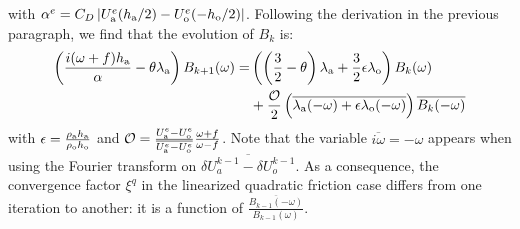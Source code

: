 with $\alpha^e=C_D\left|U_{\rm a}^e(h_{\rm a}/2) - U_{\rm o}^e(-h_{\rm o}/2)\right|$.
Following the derivation in the previous paragraph,
we find that the evolution of $B_k$ is:
\begin{equation}
	\label{eq:OASchwarz_ConvergenceAnalysis_linearizedCV}
	\begin{aligned}
    \left(\frac{i(\omega+f)h_{\rm a}}{\alpha} -
	\theta \lambda_{\rm a}\right)B_{k+1}(\omega)
		=&
    \left(\left(\frac{3}{2} - \theta\right) 
    \lambda_{\rm a}
    + \frac{3}{2} \epsilon \lambda_{\rm o} \right) B_k(\omega)\\
		&+ \frac{
    \mathcal{O}
    }{2}
    \left(
    \overline{
    \lambda_{\rm a}(-{\omega})
    +
    \epsilon\lambda_{\rm o}(-{\omega})}
    \right)
    \overline{B_k(-{\omega})}
\end{aligned}
\end{equation}
with $\epsilon = \frac{\rho_{\rm a} h_{\rm a}}{\rho_{\rm o} h_{\rm o}}$ 
and $\mathcal{O} = 
\frac{U_{\rm a}^e - U_{\rm o}^e}{\overline{U_{\rm a}^e - U_{\rm o}^e}} \frac{\omega+f}{\omega - f}$.
Note that the variable $\overline{i \omega}=-\omega$ appears when using the Fourier
transform on $\overline{\delta U_a^{k-1} - \delta U_o^{k-1}}$.
As a consequence,
the convergence factor $\xi^q$ in the linearized 
quadratic friction case differs from one iteration to another:
it is a function of
$\frac{\overline{B_{k-1}(-\omega)}}{B_{k-1}(\omega)}$.
